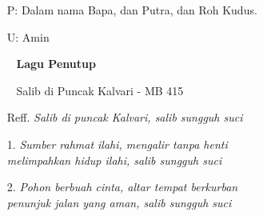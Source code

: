 \documentclass[a5paper,headsepline,titlepage,11pt,nnormalheadings,DIVcalc]{scrbook}
\newcommand{\BU}[1]{\begin{itemize} \item[U:] #1 \end{itemize}}
\newcommand{\BP}[1]{\begin{itemize} \item[P:] #1 \end{itemize}}
\begin{document}
\BP{Dalam nama Bapa, dan Putra, dan Roh Kudus. }
\BU{Amin}

\begin{itemize}
\item[~] {\bf Lagu Penutup}
\item[~] Salib di Puncak Kalvari - MB 415
\item[Reff.] \it{
Salib di puncak Kalvari, salib sungguh suci 
}
\item[1.] \it{
Sumber rahmat ilahi, mengalir tanpa henti\\
melimpahkan hidup ilahi, salib sungguh suci
}
\item[2.] \it{
Pohon berbuah cinta, altar tempat berkurban\\
penunjuk jalan yang aman, salib sungguh suci
}
\end{itemize}
\end{document}
